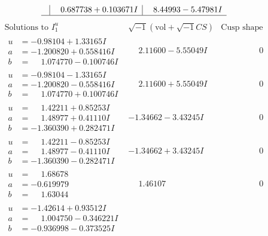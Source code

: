 \documentclass[1p]{elsarticle_modified}
\theoremstyle{definition}
\newcommand{\I}{\sqrt{-1}}
\begin{document}
$$\begin{array}{c|c|c}
 & \phantom{-}0.687738 + 0.103671 I & \phantom{-}8.44993 - 5.47981 I\\
 \hline 
 \end{array}$$\newpage$$\begin{array}{c|c|c}  
\text{Solutions to }I^u_{1}& \I (\text{vol} + \sqrt{-1}CS) & \text{Cusp shape}\\
 \hline 
\begin{aligned}
u &= -0.98104 + 1.33165 I \\
a &= -1.200820 + 0.558416 I \\
b &= \phantom{-}1.074770 - 0.100746 I\end{aligned}
 & \phantom{-}2.11600 - 5.55049 I & \phantom{-0.000000 } 0 \\ \hline\begin{aligned}
u &= -0.98104 - 1.33165 I \\
a &= -1.200820 - 0.558416 I \\
b &= \phantom{-}1.074770 + 0.100746 I\end{aligned}
 & \phantom{-}2.11600 + 5.55049 I & \phantom{-0.000000 } 0 \\ \hline\begin{aligned}
u &= \phantom{-}1.42211 + 0.85253 I \\
a &= \phantom{-}1.48977 + 0.41110 I \\
b &= -1.360390 + 0.282471 I\end{aligned}
 & -1.34662 - 3.43245 I & \phantom{-0.000000 } 0 \\ \hline\begin{aligned}
u &= \phantom{-}1.42211 - 0.85253 I \\
a &= \phantom{-}1.48977 - 0.41110 I \\
b &= -1.360390 - 0.282471 I\end{aligned}
 & -1.34662 + 3.43245 I & \phantom{-0.000000 } 0 \\ \hline\begin{aligned}
u &= \phantom{-}1.68678\phantom{ +0.000000I} \\
a &= -0.619979\phantom{ +0.000000I} \\
b &= \phantom{-}1.63044\phantom{ +0.000000I}\end{aligned}
 & \phantom{-}1.46107\phantom{ +0.000000I} & \phantom{-0.000000 } 0 \\ \hline\begin{aligned}
u &= -1.42614 + 0.93512 I \\
a &= \phantom{-}1.004750 - 0.346221 I \\
b &= -0.936998 - 0.373525 I\end{aligned}

\end{array}$$
\end{document}
